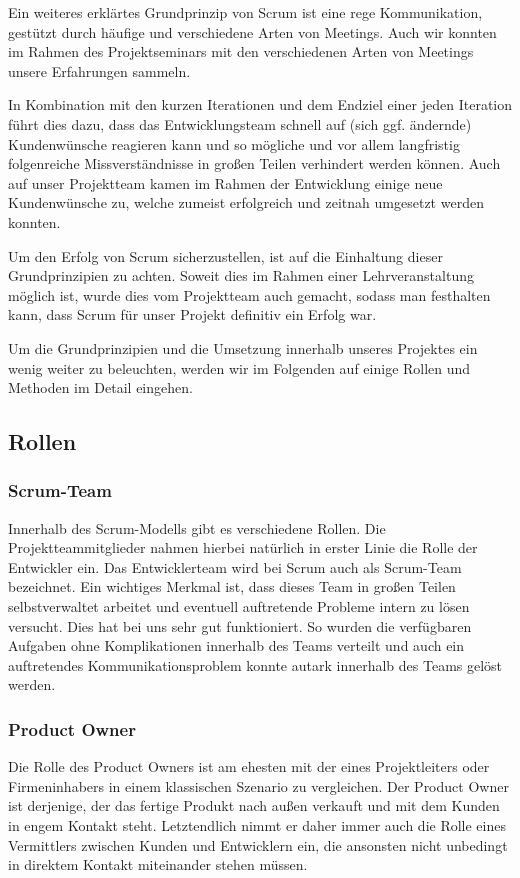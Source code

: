 Ein weiteres erklärtes Grundprinzip von Scrum ist eine rege Kommunikation, gestützt durch häufige und verschiedene Arten von Meetings. Auch wir konnten im Rahmen des Projektseminars mit den verschiedenen Arten von Meetings unsere Erfahrungen sammeln.

In Kombination mit den kurzen Iterationen und dem Endziel einer jeden Iteration führt dies dazu, dass das Entwicklungsteam schnell auf (sich ggf. ändernde) Kundenwünsche reagieren kann und so mögliche und vor allem langfristig folgenreiche Missverständnisse in großen Teilen verhindert werden können. Auch auf unser Projektteam kamen im Rahmen der Entwicklung einige neue Kundenwünsche zu, welche zumeist erfolgreich und zeitnah umgesetzt werden konnten.

Um den Erfolg von Scrum sicherzustellen, ist auf die Einhaltung dieser Grundprinzipien zu achten. Soweit dies im Rahmen einer Lehrveranstaltung möglich ist, wurde dies vom Projektteam auch gemacht, sodass man festhalten kann, dass Scrum für unser Projekt definitiv ein Erfolg war.

Um die Grundprinzipien und die Umsetzung innerhalb unseres Projektes ein wenig weiter zu beleuchten, werden wir im Folgenden auf einige Rollen und Methoden im Detail eingehen.


\subsection{Rollen}
\subsubsection{Scrum-Team}
Innerhalb des Scrum-Modells gibt es verschiedene Rollen. Die Projektteammitglieder nahmen hierbei natürlich in erster Linie die Rolle der Entwickler ein. Das Entwicklerteam wird bei Scrum auch als Scrum-Team bezeichnet. Ein wichtiges Merkmal ist, dass dieses Team in großen Teilen selbstverwaltet arbeitet und eventuell auftretende Probleme intern zu lösen versucht. Dies hat bei uns sehr gut funktioniert. So wurden die verfügbaren Aufgaben ohne Komplikationen innerhalb des Teams verteilt und auch ein auftretendes Kommunikationsproblem konnte autark innerhalb des Teams gelöst werden.

\subsubsection{Product Owner}
Die Rolle des Product Owners ist am ehesten mit der eines Projektleiters oder Firmeninhabers in einem klassischen Szenario zu vergleichen. Der Product Owner ist derjenige, der das fertige Produkt nach außen verkauft und mit dem Kunden in engem Kontakt steht. Letztendlich nimmt er daher immer auch die Rolle eines Vermittlers zwischen Kunden und Entwicklern ein, die ansonsten nicht unbedingt in direktem Kontakt miteinander stehen müssen.

